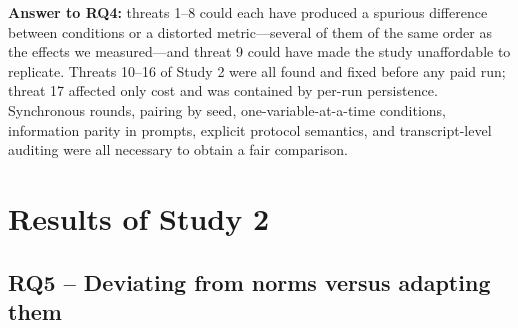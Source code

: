 \documentclass{ieeeaccess}
\begin{document}
\textbf{Answer to RQ4:} threats 1–8 could each have produced a spurious difference between conditions or a distorted metric—several of them of the same order as the effects we measured—and threat 9 could have made the study unaffordable to replicate. Threats 10–16 of Study 2 were all found and fixed before any paid run; threat 17 affected only cost and was contained by per-run persistence. Synchronous rounds, pairing by seed, one-variable-at-a-time conditions, information parity in prompts, explicit protocol semantics, and transcript-level auditing were all necessary to obtain a fair comparison.

\section{Results of Study 2}\label{sec:5}
\subsection{RQ5 – Deviating from norms versus adapting them}\label{sec:5.1}
\end{document}
